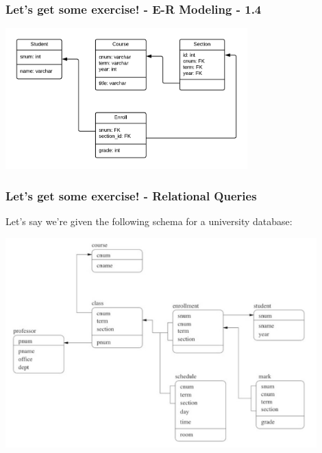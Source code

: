 \begin{frame}
\frametitle{Let's get some exercise! - E-R Modeling - 1.4}

\begin{center}
  \includegraphics[width=0.7\textwidth]{images/1-4.png}
\end{center}


\end{frame}


\begin{frame}
\frametitle{Let's get some exercise! - Relational Queries}

Let's say we're given the following schema for a university database:

\begin{center}
  \includegraphics[width=0.9\textwidth]{images/db-schema.png}
\end{center}

\end{frame}


